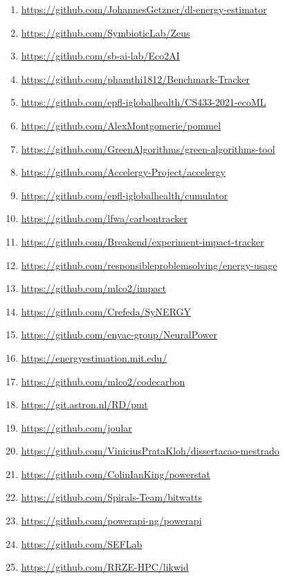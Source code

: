 \begin{enumerate}[label={\normalfont \textbf{(L\arabic*)}}] 
 \item \label{link-getzner2023} \url{https://github.com/JohannesGetzner/dl-energy-estimator}
 \item \label{link-you2023} \url{https://github.com/SymbioticLab/Zeus }
 \item \label{link-budennyy2022} \url{https://github.com/sb-ai-lab/Eco2AI }
 \item \label{link-carastan-santos2022} \url{https://github.com/phamthi1812/Benchmark-Tracker}
 \item \label{link-igescu2021} \url{https://github.com/epfl-iglobalhealth/CS433-2021-ecoML}
 \item \label{link-montgomerie-corcoran2021} \url{https://github.com/AlexMontgomerie/pommel}
 \item \label{link-lannelongue2021} \url{https://github.com/GreenAlgorithms/green-algorithms-tool}
 \item \label{link-wang2021} \url{https://github.com/Accelergy-Project/accelergy}
 \item \label{link-trebaol2020} \url{https://github.com/epfl-iglobalhealth/cumulator}
 \item \label{link-anthony2020} \url{https://github.com/lfwa/carbontracker }
 \item \label{link-henderson2020} \url{https://github.com/Breakend/experiment-impact-tracker}
 \item \label{link-lottick2019} \url{https://github.com/responsibleproblemsolving/energy-usage}
 \item \label{link-lacoste2019} \url{https://github.com/mlco2/impact}
 \item \label{link-rodrigues2018} \url{https://github.com/Crefeda/SyNERGY }
 \item \label{link-cai2017} \url{https://github.com/enyac-group/NeuralPower }
 \item \label{link-yang2017} \url{https://energyestimation.mit.edu/}
 \item \label{link-lottick2019-bis} \url{https://github.com/mlco2/codecarbon}
 \item \label{link-corda2022} \url{https://git.astron.nl/RD/pmt}
 \item \label{link-noureddine2022} \url{https://github.com/joular}
 \item \label{link-kloh2020} \url{https://github.com/ViniciusPrataKloh/dissertacao-mestrado}
 \item \label{link-becker2017} \url{https://github.com/ColinIanKing/powerstat}
 \item \label{link-colmant2014} \url{https://github.com/Spirals-Team/bitwatts}
 \item \label{link-bourdon2013} \url{https://github.com/powerapi-ng/powerapi}
 \item \label{link-ferreira2013} \url{https://github.com/SEFLab}
 \item \label{link-treibig2010} \url{https://github.com/RRZE-HPC/likwid}
\end{enumerate}
